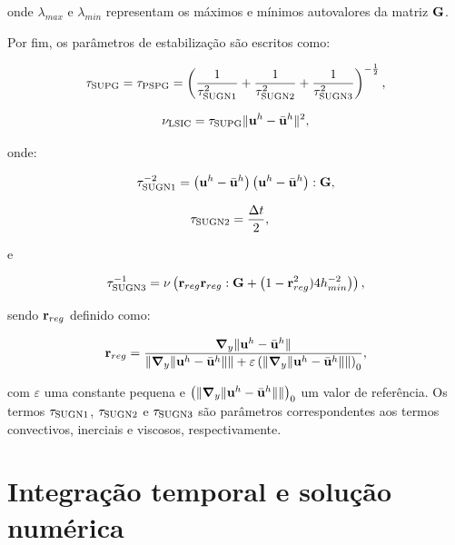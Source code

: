 \noindent onde $\lambda_{max}$ e $\lambda_{min}$ representam os máximos e mínimos autovalores da matriz $\mathbf{G}$. 

Por fim, os parâmetros de estabilização são escritos como:

\begin{align}
	\tau_{\mathrm{SUPG}} = \tau_{\mathrm{PSPG}} =\left(\frac{1}{\tau_{\mathrm{SUGN1}}^2} + \frac{1}{\tau_{\mathrm{SUGN2}}^2} + \frac{1}{\tau_{\mathrm{SUGN3}}^2} \right)^{-\frac{1}{2}}, \label{eq:tsupg_tpspg_cap2}
\end{align}

\begin{align}
	\nu_{\mathrm{LSIC}} = \tau_{\mathrm{SUPG}} \lVert\mathbf{u}^h - \bar{\mathbf{u}}^h\rVert^2 \label{eq:tlsic_cap2},
\end{align}

\noindent onde:

\begin{align}
	\tau_{\mathrm{SUGN1}}^{-2} = \left(\mathbf{u}^h - \bar{\mathbf{u}}^h \right) \left(\mathbf{u}^h - \bar{\mathbf{u}}^h \right) : \mathbf{G} ,
\end{align}

\begin{align}
	\tau_{\mathrm{SUGN2}}&=\frac{\Delta t}{2},
\end{align}

\noindent e

\begin{align}
	\tau_{\mathrm{SUGN3}}^{-1} = \nu \left(\mathbf{r}_{reg}\mathbf{r}_{reg} : \mathbf{G} + \left(1 - \mathbf{r}_{reg}^2)4h_{min}^{-2} \right)\right) ,
\end{align}

\noindent sendo $\mathbf{r}_{reg}$ definido como:

\begin{align}
	\mathbf{r}_{reg} =\frac{\boldsymbol{\nabla}_y \lVert\mathbf{u}^h - \bar{\mathbf{u}}^h\rVert}{\lVert \boldsymbol{\nabla}_y \lVert\mathbf{u}^h - \bar{\mathbf{u}}^h\rVert\rVert + \varepsilon\left(\lVert \boldsymbol{\nabla}_y \lVert\mathbf{u}^h - \bar{\mathbf{u}}^h\rVert\rVert\right)_0},
\end{align}

\noindent com $\varepsilon$ uma constante pequena e $\left(\lVert \boldsymbol{\nabla}_y \lVert\mathbf{u}^h- \bar{\mathbf{u}}^h\rVert\rVert\right)_0$ um valor de referência. Os termos $\tau_{\mathrm{SUGN1}}$, $\tau_{\mathrm{SUGN2}}$ e $\tau_{\mathrm{SUGN3}}$ são parâmetros correspondentes aos termos convectivos, inerciais e viscosos, respectivamente.

\section{Integração temporal e solução numérica}\label{capitulo:Cap2:IntegTemp}


